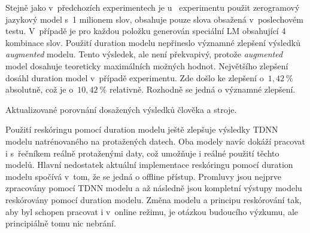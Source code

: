 Stejně jako v~předchozích experimentech je u~ experimentu použit zerogramový jazykový model s~1 milionem slov,  obsahuje pouze slova obsažená v~poslechovém testu. V~případě  je pro každou položku generován speciální LM obsahující 4 kombinace slov. Použití duration modelu nepřineslo významné zlepšení výsledků \textit{augmented} modelu. Tento výsledek, ale není překvapivý, protože \textit{augmented} model dosahuje teoreticky maximálních možných hodnot. Největšího zlepšení dosáhl duration model v~případě  experimentu. Zde došlo ke zlepšení o~$1,42\ \%$ absolutně, což je o~$10,42\ \%$ relativně. Rozhodně se jedná o významné zlepšení.

\begin{table}[htpb]
  \centering
  \def\arraystretch{1.5}
  \caption{Aktualizované porovnání dosažených výsledků člověka a stroje.}
  \label{tab:realisation:duration:comparison}
\end{table}

Použití reskóringu pomocí duration modelu ještě zlepšuje výsledky TDNN modelu natrénovaného na protažených datech. Oba modely navíc dokáží pracovat i s~řečníkem reálně protaženými daty, což umožňuje i reálné použití těchto modelů. Hlavní nedostatek aktuální implementace reskóringu pomocí duration modelu spočívá v~tom, že se jedná o offline přístup. Promluvy jsou nejprve zpracovány pomocí TDNN modelu a až následně jsou kompletní výstupy modelu reskórovány pomocí duration modelu. Změna modelu a principu reskórování tak, aby byl schopen pracovat i v~online režimu, je otázkou budoucího výzkumu, ale principiálně tomu nic nebrání.
